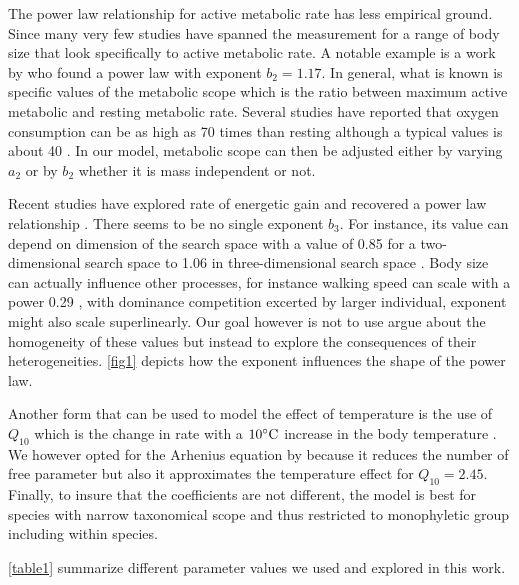 The power law relationship for active metabolic rate has less empirical ground.
Since many very few studies have spanned the measurement for a range of body size that look specifically to active metabolic rate.
A notable example is a work by \citet{Bartholomew1978} who found a power law with exponent $b_2 = 1.17$.
In general, what is known is specific values of the metabolic scope which is the ratio between maximum active metabolic and resting metabolic rate.
Several studies have reported that oxygen consumption can be as high as 70 times than resting although a typical values is about 40 \citep{Bartholomew1981}.  
In our model, metabolic scope can then be adjusted either by varying $a_2$  or by $b_2$ whether it is mass independent or not. 

Recent studies have explored rate of energetic gain and recovered a power law relationship \citep{Maino2015, Pawar2012}.
There seems to be no single exponent $b_3$.
For instance, its value can depend on dimension of the search space with a value of 0.85 for a two-dimensional search space to 1.06 in three-dimensional search space \citep{Pawar2012}.
Body size can actually influence other processes, for instance walking speed  can scale with a power 0.29 \citep{Peters1986}, with dominance competition excerted by larger individual, exponent might also scale superlinearly.
Our goal however is not to use argue about the homogeneity of these values but instead to explore the consequences of their heterogeneities.
\cref{fig1} depicts how the exponent influences the shape of the power law.

Another form that can be used to model the effect of temperature is the use of $Q_{10}$ which is the change in rate with a $10^ {\circ} \rm{C}$ increase in the body temperature \citep{Precht1973}.
We however opted for the Arhenius equation by \citet{Brown2004} because it reduces the number of free parameter but also it approximates the temperature effect for $Q_{10} = 2.45$.  
Finally, to  insure that the coefficients are not different, the model is best for species with narrow taxonomical scope and thus restricted to monophyletic group including within species. 

\cref{table1} summarize different parameter values we used and explored in this work.

